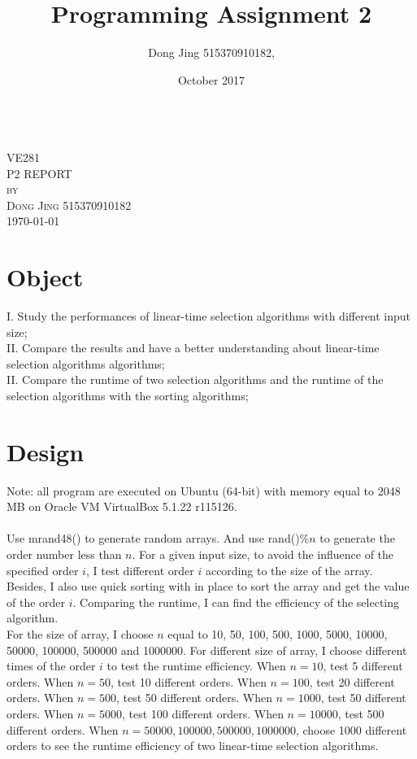 \documentclass{article}
\title{Programming Assignment 2}
\author{Dong Jing 515370910182,}
\date{October 2017}
\begin{document}
\begin{titlepage}

\begin{center}


\textsc{\LARGE }
 \\[3cm]

\textsc{\LARGE VE281}\\[5cm]

\textsc{\Large P2 REPORT}\\[5cm]


\textsc{by}\\[1cm]
\textsc{\Large Dong Jing 515370910182}\\[0.5cm]



{\large \today}

\end{center}

\end{titlepage}
\section{Object}
I. Study the performances of linear-time selection algorithms with different input size;\\
II. Compare the results and have a better understanding about linear-time selection algorithms algorithms;\\
II. Compare the runtime of two selection algorithms and the runtime of the selection algorithms with the sorting algorithms;\\
\section{Design}
Note: all program are executed on Ubuntu (64-bit) with memory equal to 2048 MB on Oracle VM VirtualBox 5.1.22 r115126.\\
\\
Use mrand48() to generate random arrays. And use rand()\%$n$ to generate the order number less than $n$. For a given input size, to avoid the influence of the specified order $i$, I test different order $i$ according to the size of the array. Besides, I also use quick sorting with in place to sort the array and get the value of the order $i$. Comparing the runtime, I can find the efficiency of the selecting algorithm.\\
For the size of array, I choose $n$ equal to 10, 50, 100, 500, 1000, 5000, 10000, 50000, 100000, 500000 and 1000000. For different size of array, I choose different times of the order $i$ to test the runtime efficiency.
When $n=10$, test 5 different orders. When $n=50$, test 10 different orders. When $n=100$, test 20 different  orders. When $n=500$, test 50 different orders. When $n=1000$, test 50 different orders. When $n=5000$, test 100 different orders. When $n=10000$, test 500 different orders. When $n=50000, 100000, 500000,1000000$, choose 1000 different orders to see the runtime efficiency of two linear-time selection algorithms.\\
\end{document}
